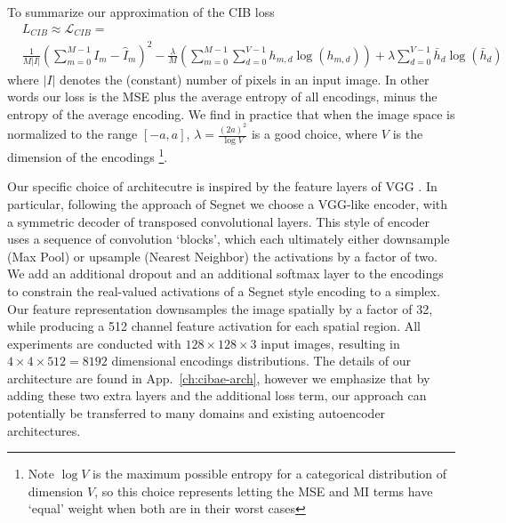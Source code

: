 To summarize our approximation of the CIB loss
\begin{equation}
\begin{split}
& L_{CIB} \approx \mathcal{L}_{CIB} =\\
&  \frac{1}{M |I|} \left( \sum_{m=0}^{M-1} I_m - \hat{I}_m \right)^2
- \frac{\lambda}{M} \left( \sum_{m=0}^{M-1} \sum_{d=0}^{V-1} h_{m,d}\log(h_{m,d}) \right)
+ \lambda \sum_{d=0}^{V-1} \bar{h}_{d}\log(\bar{h}_{d})
\end{split}
\end{equation}
where $|I|$ denotes the (constant) number of pixels in an input image. In other words our loss is the MSE plus the average entropy of all encodings, minus the entropy of the average encoding. We find in practice that when the image space is normalized to the range $[-a,a]$, $\lambda = \frac{(2a)^2}{\log V}$ is a good choice, where $V$ is the dimension of the encodings \footnote{Note $\log V$ is the maximum possible entropy for a categorical distribution of dimension $V$, so this choice represents letting the MSE and MI terms have `equal' weight when both are in their worst cases}.

Our specific choice of architecutre is inspired by the feature layers of VGG \citep{Simonyan14c}. In particular, following the approach of Segnet \citep{BadrinarayananK15} we choose a VGG-like encoder, with a symmetric decoder of transposed convolutional layers. This style of encoder uses a sequence of convolution `blocks', which each ultimately either downsample (Max Pool) or upsample (Nearest Neighbor) the activations by a factor of two. We add an additional dropout and an additional softmax layer to the encodings to constrain the real-valued activations of a Segnet style encoding to a simplex. Our feature representation downsamples the image spatially by a factor of 32, while producing a 512 channel feature activation for each spatial region. All experiments are conducted with $128 \times 128 \times 3$ input images, resulting in $4 \times 4 \times 512 = 8192$ dimensional encodings distributions. The details of our architecture are found in App.~\ref{ch:cibae-arch}, however we emphasize that by adding these two extra layers and the additional loss term, our approach can potentially be transferred to many domains and existing autoencoder architectures.

